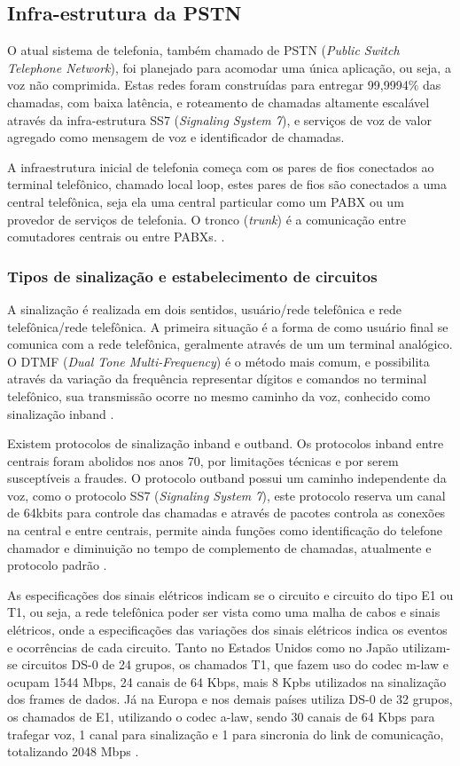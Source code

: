 \subsection{Infra-estrutura da PSTN}
O atual sistema de telefonia, também chamado de PSTN (\textit{Public Switch Telephone Network}), foi planejado para acomodar uma única aplicação, ou seja, a voz não comprimida. Estas redes foram construídas para entregar 99,9994$ \% $ das chamadas, com baixa latência, e roteamento de chamadas altamente escalável através da infra-estrutura SS7 (\textit{Signaling System 7}), e serviços de voz de valor agregado como mensagem de voz e identificador de chamadas.

A infraestrutura inicial de telefonia começa com os pares de fios conectados ao terminal telefônico, chamado local loop, estes pares de fios são conectados a uma central telefônica, seja ela uma central particular como um PABX ou um provedor de serviços de telefonia. O tronco (\textit{trunk}) é a comunicação entre comutadores centrais ou entre PABXs. \cite{eduardotude2014}.

\subsubsection{Tipos de sinalização e estabelecimento de circuitos}
A sinalização é realizada em dois sentidos, usuário/rede telefônica e rede telefônica/rede telefônica. A primeira situação é a forma de como usuário final se comunica com a rede telefônica, geralmente através de um um terminal analógico. O DTMF (\textit{Dual Tone Multi-Frequency}) é o método mais comum, e possibilita através da variação da frequência representar dígitos e comandos no terminal telefônico, sua transmissão ocorre no mesmo caminho da voz, conhecido como sinalização inband \cite{thiagowinkler2007}.

Existem protocolos de sinalização inband e outband. Os protocolos inband entre centrais foram abolidos nos anos 70, por limitações técnicas e por serem susceptíveis a fraudes. O protocolo outband possui um caminho independente da voz, como o protocolo SS7 (\textit{Signaling System 7}), este protocolo  reserva um canal de 64kbits para controle das chamadas e através de pacotes controla as conexões na central e entre centrais, permite ainda funções como identificação do telefone chamador e diminuição no tempo de complemento de chamadas, atualmente e protocolo padrão \cite{eduardomaronasmonks2006}.

As especificações dos sinais elétricos indicam se o circuito e circuito do tipo E1 ou T1, ou seja, a rede telefônica poder ser vista como uma malha de cabos e sinais elétricos, onde a especificações das variações dos sinais elétricos indica os eventos e ocorrências de cada circuito. Tanto no Estados Unidos como no Japão utilizam-se circuitos DS-0 de 24 grupos, os chamados T1, que fazem uso do codec m-law e ocupam 1544 Mbps, 24 canais de 64 Kbps, mais 8 Kpbs utilizados na sinalização dos frames de dados. Já na Europa e nos demais países utiliza DS-0 de 32 grupos, os chamados de E1, utilizando o codec a-law, sendo 30 canais de 64 Kbps para trafegar voz, 1 canal para sinalização e 1 para sincronia do link de comunicação, totalizando 2048 Mbps \cite{alexandrekeller2014}.

